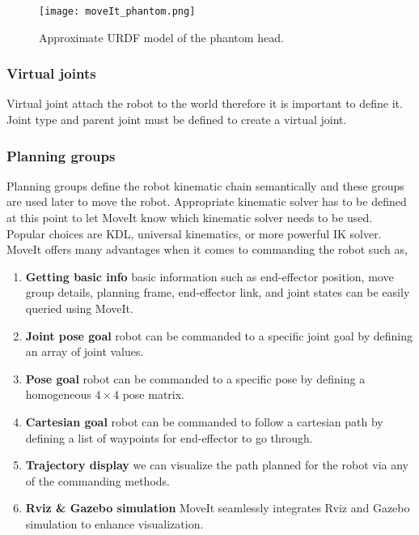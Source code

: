 \begin{figure}[hbt!]
	\centering
	\texttt{[image: moveIt\_phantom.png]}
	\caption{Approximate URDF model of the phantom head.} 
	\label{fig:moveIt_phantom}
\end{figure}

\subsubsection{Virtual joints} Virtual joint attach the robot to the world therefore it is important to define it. Joint type and parent joint must be defined to create a virtual joint.

\subsubsection{Planning groups} Planning groups define the robot kinematic chain semantically and these groups are used later to move the robot. Appropriate kinematic solver has to be defined at this point to let MoveIt know which kinematic solver needs to be used. Popular choices are KDL, universal kinematics, or more powerful IK solver.\\

MoveIt offers many advantages when it comes to commanding the robot such as, 

\begin{enumerate}
	\item \textbf{Getting basic info} basic information such as end-effector position, move group details, planning frame, end-effector link, and joint states can be easily queried using MoveIt.
	\item \textbf{Joint pose goal} robot can be commanded to a specific joint goal by defining an array of joint values.
	\item \textbf{Pose goal} robot can be commanded to a specific pose by defining a homogeneous $4\times4$ pose matrix.
	\item \textbf{Cartesian goal} robot can be commanded to follow a cartesian path by defining a list of waypoints for end-effector to go through.
	\item \textbf{Trajectory display} we can visualize the path planned for the robot via any of the commanding methods.
	\item \textbf{Rviz \& Gazebo simulation} MoveIt seamlessly integrates Rviz and Gazebo simulation to enhance visualization.
\end{enumerate} 